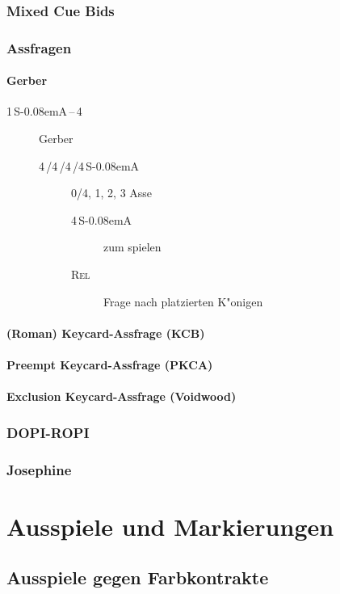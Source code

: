 \documentclass[11pt,german,twocolumn]{scrartcl}
\renewcommand{\Cl}{{\color{ClColor}{$\clubsuit$}}}
\renewcommand{\Di}{{\color{DiColor}{$\vardiamondsuit$}}}
\renewcommand{\He}{{\color{HeColor}{$\varheartsuit$}}}
\renewcommand{\Sp}{{\color{SpColor}{$\spadesuit$}}}
\def\pik{\,\Sp}
\def\coe{\,\He}
\def\kar{\,\Di}
\def\tre{\,\Cl}
\def\SA{\textsf{\,S\kern-0.08emA}}
\def\sep{\,--\,}
\def\rel{\textsc{Rel}}
\def\bdsc{\begin{description}}
\def\edsc{\end{description}}
\begin{document}
\subsubsection{Mixed Cue Bids}

\subsubsection{Assfragen}

\paragraph{Gerber}

\bdsc
\item[1\SA\sep4\tre] Gerber
 \bdsc
 \item[4\kar/4\coe/4\pik/4\SA] 0/4, 1, 2, 3 Asse
  \bdsc
  \item[4\SA] zum spielen
  \item[\rel] Frage nach platzierten K"onigen
  \edsc
 \edsc
\edsc

\paragraph{(Roman) Keycard-Assfrage (KCB)}

\paragraph{Preempt Keycard-Assfrage (PKCA)}

\paragraph{Exclusion Keycard-Assfrage (Voidwood)}

\subsubsection{DOPI-ROPI}

\subsubsection{Josephine}

\section{Ausspiele und Markierungen}

\subsection{Ausspiele gegen Farbkontrakte}
\end{document}
